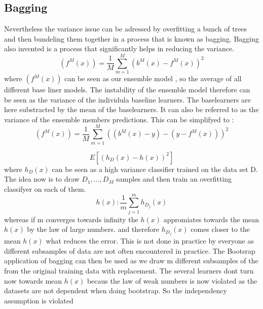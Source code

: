 \documentclass[12pt]{article}
\begin{document}
\subsection{Bagging}
Nevertheless the variance issue can be adressed by overfitting a bunch of trees and then bundeling them together in a process that is known as bagging. Bagging also invented is a process that significantly helps in reducing the variance. 
$$(f^{M}(x)) =  \frac{1}{M}\sum_{m=1}^{M}(b^{M}(x)-f^{M}(x))^2$$
where $(f^{M}(x))$ can be seen as our ensemble model , so the average of all different base liner models. The instability of the ensemble model therefore can be seen as the variance of the individula baseline learners. The baselearners are here substracted by the mean of the baselearners. It can also be referred to as the variance of the ensemble members predictions. 
This can be simplifyed to : 
$$(f^{M}(x)) =  \frac{1}{M}\sum_{m=1}^{M}((b^{M}(x)-y)-(y-f^{M}(x)))^2$$

$$E[(h_D(x)-h(x))^2]$$ where $h_D(x)$ can be seen as a high variance classifier trained on the data set D. The idea now is to draw $D_1,\ldots,D_M$ samples and then train an overfitting classifyer on each of them. $$h(x): \frac{1}{m}\sum_{j=1}^{m}h_{D_{j}}(x)$$ whereas if m converges towards infinity the $h(x)$ appromiates towards the mean$h(x)$ by the law of large numbers.  and therefore $h_{D_{j}}(x)$ comes closer to the mean $h(x)$ what reduces the error. This is not done in practice by everyone as different subsamples of data are not often encountered in practice. The Bootsrap application of bagging can then be used as we draw m different subsamples of the from the original training data with replacement. The several learners dont turn now towards  mean $h(x)$ becaus the law of weak numbers is now violated as the datasets are not dependent when doing bootstrap. So the independency assumption is violated
\end{document}
